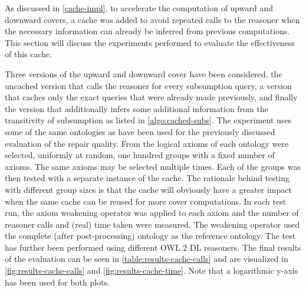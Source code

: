 
As discussed in \cref{cache-impl}, to accelerate the computation of upward and downward covers, a cache was added to avoid repeated calls to the reasoner when the necessary information can already be inferred from previous computations. This section will discuss the experiments performed to evaluate the effectiveness of this cache.

Three versions of the upward and downward cover have been considered, the uncached version that calls the reasoner for every subsumption query, a version that caches only the exact queries that were already made previously, and finally the version that additionally infers some additional information from the transitivity of subsumption as listed in \cref{algo:cached-subs}. The experiment uses some of the same ontologies as have been used for the previously discussed evaluation of the repair quality. From the logical axioms of each ontology were selected, uniformly at random, one hundred groups with a fixed number of axioms. The same axioms may be selected multiple times. Each of the groups was then tested with a separate instance of the cache. The rationale behind testing with different group sizes is that the cache will obviously have a greater impact when the same cache can be reused for more cover computations. In each test run, the axiom weakening operator was applied to each axiom and the number of reasoner calls and (real) time taken were measured. The weakening operator used the complete (after post-processing) ontology as the reference ontology. The test has further been performed using different OWL 2 DL reasoners. The final results of the evaluation can be seen in \cref{table:results-cache-calls} and are visualized in \cref{fig:results-cache-calls} and \cref{fig:results-cache-time}. Note that a logarithmic y-axis has been used for both plots.

